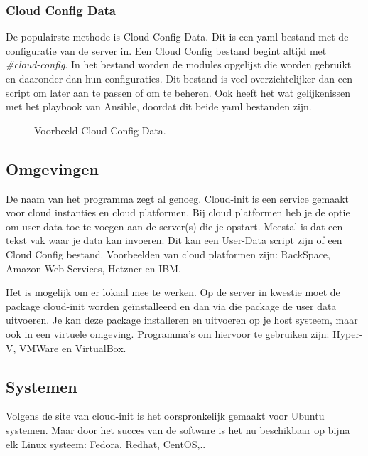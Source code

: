 \subsubsection{Cloud Config Data}
De populairste methode is Cloud Config Data. Dit is een yaml bestand met de configuratie van de server in. Een Cloud Config bestand begint altijd met \textit{\#cloud-config}. In het bestand worden de modules opgelijst die worden gebruikt en daaronder dan hun configuraties. Dit bestand is veel overzichtelijker dan een script om later aan te passen of om te beheren. Ook heeft het wat gelijkenissen met het playbook van Ansible, doordat dit beide yaml bestanden zijn.
\begin{figure}[!htb]
	\caption{Voorbeeld Cloud Config Data.}
	\label{fig:udatascript}
\end{figure}

\subsection{Omgevingen}
De naam van het programma zegt al genoeg. Cloud-init is een service gemaakt voor cloud instanties en cloud platformen. Bij cloud platformen heb je de optie om user data toe te voegen aan de server(s) die je opstart. Meestal is dat een tekst vak waar je data kan invoeren. Dit kan een User-Data script zijn of een Cloud Config bestand. Voorbeelden van cloud platformen zijn: RackSpace, Amazon Web Services, Hetzner en IBM. 

Het is mogelijk om er lokaal mee te werken. Op de server in kwestie moet de package cloud-init worden geïnstalleerd en dan via die package de user data uitvoeren. Je kan deze package installeren en uitvoeren op je host systeem, maar ook in een virtuele omgeving. Programma's om hiervoor te gebruiken zijn: Hyper-V, VMWare en VirtualBox.

\subsection{Systemen}
Volgens de site van cloud-init \autocite{cloudsite} is het oorspronkelijk gemaakt voor Ubuntu systemen. Maar door het succes van de software is het nu beschikbaar op bijna elk Linux systeem: Fedora, Redhat, CentOS,..


